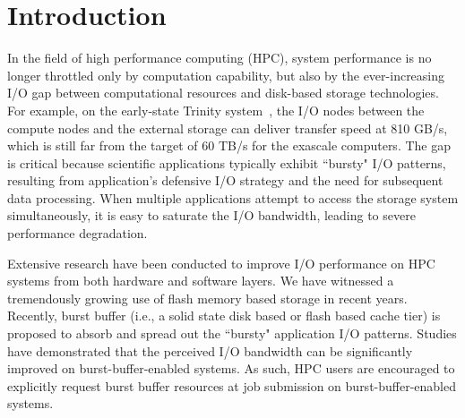 \section{Introduction}

In the field of high performance computing (HPC), 
system performance is no longer throttled only by computation capability,
but also by the ever-increasing I/O gap
between computational resources and disk-based storage technologies.
For example, on the early-state Trinity system~\cite{TrinitySystem}, the I/O nodes between
the compute nodes and the external storage can deliver transfer speed at 810 GB/s,
which is still far from the target of 60 TB/s for the exascale computers\cite{Shalf:HPCCS:2010}.
The gap is critical because scientific applications typically exhibit
``bursty" I/O patterns,
resulting from application's defensive I/O strategy
and the need  for subsequent data processing\cite{Carns:MSST:2011, Kim:PDSW:2010, Latham:CSD:2012, Naik:ICPPW:2009, Dennis:CUG:2009}. 
When multiple applications attempt to access the storage system simultaneously, 
it is easy to saturate
the I/O bandwidth, leading to severe performance degradation.


Extensive research have been conducted to improve I/O performance on HPC systems from
both hardware and software layers.
We have witnessed a tremendously growing use of flash memory based storage in recent years.
Recently, burst buffer (i.e., a solid state disk based or flash based cache tier)
is proposed to absorb and spread out
the ``bursty" application I/O patterns\cite{Bent:HBP:2011, Grider:EXA:2010}.
Studies have demonstrated that the perceived I/O
bandwidth can be significantly improved on burst-buffer-enabled systems\cite{Liu:MSST:2012}.
As such, HPC users are encouraged to explicitly request burst buffer resources at job submission 
on burst-buffer-enabled systems\cite{apex-workflow}.

